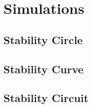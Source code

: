 \chapter{Simulations} \label{Simulations}
\section{ Stability Circle} \label{ Stability Circle} 
\section{ Stability Curve} \label{ Stability Curve } 
\section{ Stability Circuit} \label{ Stability Circuit } 

